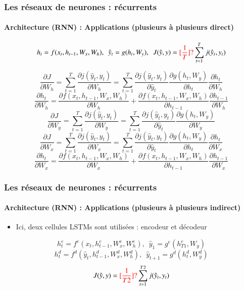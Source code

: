 \documentclass[xcolor=table]{beamer}
\begin{document}
\begin{frame}
	\frametitle{Les réseaux de neurones : récurrents}
	\framesubtitle{Architecture (RNN) : Applications (plusieurs à plusieurs direct)}
	\vspace*{-0.5cm}
	\[ h_t = f(x_t, h_{t-1}, W_x, W_h),\,\,\, \hat{y}_t = g(h_t, W_y),\,\,\,  J(\hat{y}, y) = \textcolor{red}{[\frac{1}{T}]?} \sum_{t=1}^{T} j(\hat{y}_t, y_t)\]
	
	\vspace*{-0.5cm}
	\begin{minipage}{0.7\textwidth}\scriptsize
	\[\frac{\partial J}{\partial W_h} = \sum_{t=1}^{T} \frac{\partial j(\hat{y}_t, y_t)}{\partial W_h}
	= \sum_{t=1}^{T} \frac{\partial j(\hat{y}_t, y_t)}{\partial \hat{y}_t} 
	\frac{\partial g(h_t, W_y)}{\partial h_t} 
	\frac{\partial h_t}{\partial W_h}
	\]
	\[\frac{\partial h_t}{\partial W_h} = 
	\frac{\partial f(x_t, h_{t-1}, W_x, W_h)}{\partial W_h} + 
	\frac{\partial f(x_t, h_{t-1}, W_x, W_h)}{\partial h_{t-1}} \frac{\partial h_{t-1}}{\partial W_h}
	\]
	\[\frac{\partial J}{\partial W_y} 
	= \sum_{t=1}^{T} \frac{\partial j(\hat{y}_t, y_t)}{\partial W_y}
	= \sum_{t=1}^{T} \frac{\partial j(\hat{y}_t, y_t)}{\partial \hat{y}_t} 
	\frac{\partial g(h_t, W_y)}{\partial W_y}
	\]
	\[\frac{\partial J}{\partial W_x} = \sum_{t=1}^{T} \frac{\partial j(\hat{y}_t, y_t)}{\partial W_x}
	= \sum_{t=1}^{T} \frac{\partial j(\hat{y}_t, y_t)}{\partial \hat{y}_t} 
	\frac{\partial g(h_t, W_y)}{\partial h_t} 
	\frac{\partial h_t}{\partial W_x}
	\]
	\[\frac{\partial h_t}{\partial W_x} = 
	\frac{\partial f(x_t, h_{t-1}, W_x, W_h)}{\partial W_x} + 
	\frac{\partial f(x_t, h_{t-1}, W_x, W_h)}{\partial h_{t-1}} \frac{\partial h_{t-1}}{\partial W_x}
	\]
	\end{minipage}
	\begin{minipage}{0.2\textwidth}
	\end{minipage}
	
\end{frame}

\begin{frame}
	\frametitle{Les réseaux de neurones : récurrents}
	\framesubtitle{Architecture (RNN) : Applications (plusieurs à plusieurs indirect)}
	
	\begin{itemize}
		\item Ici, deux cellules LSTMs sont utilisées : encodeur et décodeur
	\end{itemize}

	\[ h^e_t = f^e(x_t, h^e_{t-1}, W^e_x, W^e_h), \,\,\, \hat{y}_1 = g^e(h^e_{T1}, W_y)\]
	\[ h^d_{t} = f^d(\hat{y}_{t}, h^d_{t-1}, W^d_x, W^d_h), \,\,\, \hat{y}_{t+1} = g^d(h^d_{t}, W^d_y)\]
	\[ J(\hat{y}, y) = \textcolor{red}{[\frac{1}{T2}]?} \sum_{t=1}^{T2} j(\hat{y}_{t}, y_t)\]
	\begin{center}
	\end{center}
\end{frame}
\end{document}
